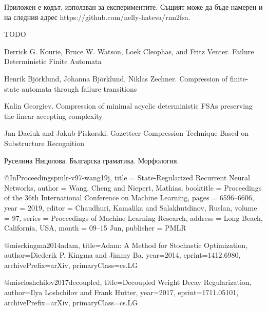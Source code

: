 \documentclass[a4paper,12pt]{article}
\begin{document}
Приложен е кодът, използван за експериментите. Същият може да бъде намерен и на следния адрес https://github.com/nelly-hateva/rnn2fsa.

TODO

\pagebreak

\begin{thebibliography}{}

\newblock Derrick G. Kourie, Bruce W. Watson, Loek Cleophas, and Fritz Venter.
\newblock Failure Deterministic Finite Automata

\newblock Henrik Björklund, Johanna Björklund, Niklas Zechner.
\newblock Compression of finite-state automata through failure transitions

\newblock Kalin Georgiev.
\newblock Compression of minimal acyclic deterministic FSAs preserving the linear accepting complexity

\newblock Jan Daciuk and Jakub Piskorski.
\newblock Gazetteer Compression Technique Based on Substructure Recognition

\newblock Руселина Ницолова.
\newblock Българска граматика. Морфология.

@InProceedings{pmlr-v97-wang19j,  
          title = 	 {State-Regularized Recurrent Neural Networks},  
          author = 	 {Wang, Cheng and Niepert, Mathias},  
          booktitle = 	 {Proceedings of the 36th International Conference on Machine Learning},  
          pages = 	 {6596--6606},  
          year = 	 {2019},  
          editor = 	 {Chaudhuri, Kamalika and Salakhutdinov, Ruslan},  
          volume = 	 {97},  
          series = 	 {Proceedings of Machine Learning Research},  
          address = 	 {Long Beach, California, USA},  
          month = 	 {09--15 Jun},  
          publisher = 	 {PMLR}  
        }

@misc{kingma2014adam,
    title={Adam: A Method for Stochastic Optimization},
    author={Diederik P. Kingma and Jimmy Ba},
    year={2014},
    eprint={1412.6980},
    archivePrefix={arXiv},
    primaryClass={cs.LG}
}

@misc{loshchilov2017decoupled,
    title={Decoupled Weight Decay Regularization},
    author={Ilya Loshchilov and Frank Hutter},
    year={2017},
    eprint={1711.05101},
    archivePrefix={arXiv},
    primaryClass={cs.LG}
}

\end{thebibliography}

\pagebreak
\end{document}
